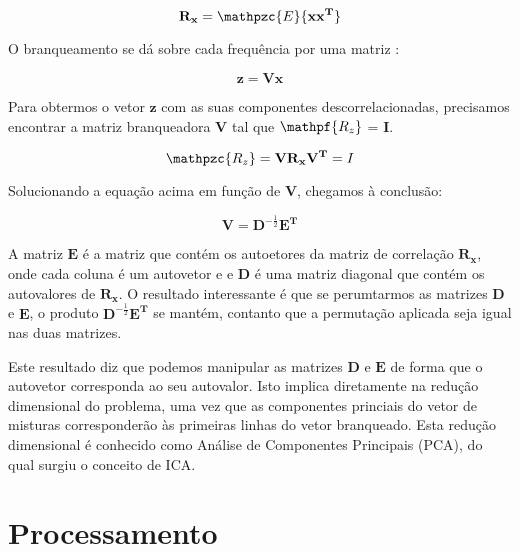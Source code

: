         \begin{equation}\label{eq:covariance}
            \mathbf{R_x} = \mathpzc{E}\{\mathbf{xx^T}\}
        \end{equation}
        
        O branqueamento se dá sobre cada frequência por uma matriz :
        
        \begin{equation}\label{eq:whiteningfrequency}
            \mathbf{z} = \mathbf{V}\mathbf{x}
        \end{equation}
        
        Para obtermos o vetor $\mathbf{z}$ com as suas componentes descorrelacionadas, precisamos encontrar a matriz branqueadora $\mathbf{V}$ tal que $\mathpf{R_z}$ = $\mathbf{I}$.

        \begin{equation}
            \label{whiteningproof}
        \mathpzc{R_z} = \mathbf{V}\mathbf{R_x}\mathbf{V^T} = I 
        \end{equation}

        Solucionando a equação acima em função de $\mathbf{V}$, chegamos à conclusão:
        
        \begin{equation}\label{eq:vk}
            \mathbf{V} = \mathbf{D}^{-\frac{1}{2}}\mathbf{E^T}
        \end{equation}
        
        A matriz $\mathbf{E}$ é a matriz que contém os autoetores da matriz de correlação $\mathbf{R_x}$, onde cada coluna é um autovetor e e $\mathbf{D}$ é uma matriz diagonal que contém os autovalores de $\mathbf{R_x}$. O resultado interessante é que se perumtarmos as matrizes $\mathbf{D}$ e $\mathbf{E}$, o produto $\mathbf{D}^{-\frac{1}{2}}\mathbf{E^T}$ se mantém, contanto que a permutação aplicada seja igual nas duas matrizes.
        
        Este resultado diz que podemos manipular as matrizes $\mathbf{D}$ e $\mathbf{E}$ de forma que o autovetor corresponda ao seu autovalor. Isto implica diretamente na redução dimensional do problema, uma vez que as componentes princiais do vetor de misturas corresponderão às primeiras linhas do vetor branqueado. Esta redução dimensional é conhecido como Análise de Componentes Principais (PCA), do qual surgiu o conceito de ICA. 
        
\section{Processamento}

